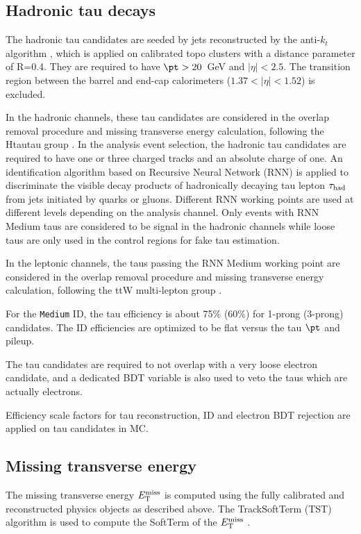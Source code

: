 \subsection{Hadronic tau decays}
\label{sec:taurecon}
The hadronic tau candidates \cite{tau_sys1} are seeded by jets reconstructed by the anti-$k_t$ algorithm \cite{antikt}, which is applied on calibrated topo clusters \cite{topocluster} with a distance parameter of R=0.4. They are required to have $\pt > 20$~GeV and $|\eta|<2.5$. The transition region between the barrel and end-cap calorimeters ($1.37<|\eta|<1.52$) is excluded.

In the hadronic channels, these tau candidates are considered in the overlap removal procedure and missing transverse energy calculation, following the Htautau group \cite{Htautau-note}. In the analysis event selection, the hadronic tau candidates are required to have one or three charged tracks and an absolute charge of one. An identification algorithm based on Recursive Neural Network (RNN) \cite{tau_sys2} is applied to discriminate the visible decay products of hadronically decaying tau lepton $\tau_\text{had}$ from jets initiated by quarks or gluons. Different RNN working points are used at different levels depending on the analysis channel. Only events with RNN Medium taus are considered to be signal in the hadronic channels while loose taus are only used in the control regions for fake tau estimation.

In the leptonic channels, the taus passing the RNN Medium working point are considered in the overlap removal procedure and missing transverse energy calculation, following the ttW multi-lepton group \cite{ttHMLgroup}.

For the \texttt{Medium} ID, the tau efficiency is about 75\% (60\%) for 1-prong (3-prong) candidates. The ID efficiencies are optimized to be flat versus the tau $\pt$ and pileup.

The tau candidates are required to not overlap with a very loose electron candidate, and a dedicated BDT variable is also used to veto the taus which are actually electrons.

Efficiency scale factors for tau reconstruction, ID and electron BDT rejection \cite{TauCP} are applied on tau candidates in MC.

\subsection{Missing transverse energy}
The missing transverse energy $E_{\text{T}}^{\text{miss}}$ is computed using the fully calibrated and reconstructed physics objects as described above. The TrackSoftTerm (TST) algorithm is used to compute the SoftTerm of the $E_{\text{T}}^{\text{miss}}$ \cite{MET}. 

